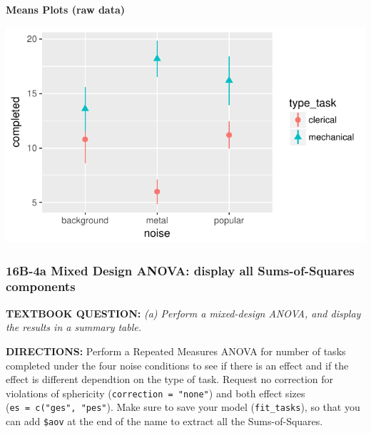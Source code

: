 \documentclass[]{article}
\newenvironment{Shaded}{\begin{snugshade}}{\end{snugshade}}
\newcommand{\KeywordTok}[1]{\textcolor[rgb]{0.13,0.29,0.53}{\textbf{#1}}}
\newcommand{\DataTypeTok}[1]{\textcolor[rgb]{0.13,0.29,0.53}{#1}}
\newcommand{\StringTok}[1]{\textcolor[rgb]{0.31,0.60,0.02}{#1}}
\newcommand{\CommentTok}[1]{\textcolor[rgb]{0.56,0.35,0.01}{\textit{#1}}}
\newcommand{\OperatorTok}[1]{\textcolor[rgb]{0.81,0.36,0.00}{\textbf{#1}}}
\newcommand{\NormalTok}[1]{#1}
\begin{document}
\textbf{Means Plots (raw data)}

\begin{center}\includegraphics{Unit_5_assignment_KEY_R__spr18__files/figure-latex/unnamed-chunk-53-1} \end{center}

\clearpage

\subsubsection{16B-4a Mixed Design ANOVA: display all Sums-of-Squares
components}\label{b-4a-mixed-design-anova-display-all-sums-of-squares-components}

\textbf{TEXTBOOK QUESTION:} \emph{(a) Perform a mixed-design ANOVA, and
display the results in a summary table.}

\textbf{DIRECTIONS:} Perform a Repeated Measures ANOVA for number of
tasks completed under the four noise conditions to see if there is an
effect and if the effect is different dependtion on the type of task.
Request no correction for violations of sphericity
(\texttt{correction\ =\ "none"}) and both effect sizes
(\texttt{es\ =\ c("ges",\ "pes"}). Make sure to save your model
(\texttt{fit\_tasks}), so that you can add \texttt{\$aov} at the end of
the name to extract all the Sums-of-Squares.

\begin{Shaded}
\end{Shaded}
\end{document}
